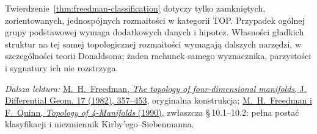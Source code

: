 Twierdzenie~\ref{thm:freedman-classification}
dotyczy tylko zamkniętych, zorientowanych,
jednospójnych rozmaitości w kategorii TOP.
Przypadek ogólnej grupy podstawowej wymaga
dodatkowych danych i hipotez. Własności gładkich
struktur na tej samej topologicznej rozmaitości
wymagają dalszych narzędzi, w szczególności
teorii Donaldsona; żaden rachunek samego
wyznacznika, parzystości i sygnatury ich nie rozstrzyga.

\par\smallskip
{\footnotesize\noindent\emph{Dalsza lektura:}
\href{https://projecteuclid.org/journals/journal-of-differential-geometry/volume-17/issue-3/The-topology-of-four-dimensional-manifolds/10.4310/jdg/1214437136.full}
{M.\ H.\ Freedman, \emph{The topology of four-dimensional
manifolds}, J. Differential Geom. 17 (1982), 357--453},
oryginalna konstrukcja;
\href{https://archive.mpim-bonn.mpg.de/4789/2/FreedmanQuinn-TopologyOf4Manifolds-Reformatted2013.pdf}
{M.\ H.\ Freedman i F.\ Quinn, \emph{Topology of
4-Manifolds} (1990)}, zwłaszcza \S\,10.1--10.2:
pełna postać klasyfikacji i niezmiennik
Kirby'ego--Siebenmanna.\par}
